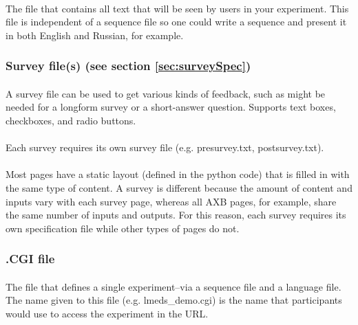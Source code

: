 \paragraph{}
The file that contains all text that will be seen by users in your experiment.  This file is independent of a sequence file so one could write a sequence and present it in both English and Russian, for example.


\subsubsection{Survey file(s) (see section \ref{sec:surveySpec})}

\paragraph{}
A survey file can be used to get various kinds of feedback, such as might be needed for a longform survey or a short-answer question.  Supports text boxes, checkboxes, and radio buttons.

\paragraph{}
Each survey requires its own survey file (e.g. presurvey.txt, postsurvey.txt).

\paragraph{}
Most pages have a static layout (defined in the python code) that is filled in with the same type of content.  A survey is different because the amount of content and inputs vary with each survey page, whereas all AXB pages, for example, share the same number of inputs and outputs.  For this reason, each survey requires its own specification file while other types of pages do not.


\subsubsection{.CGI file}

\paragraph{}
The file that defines a single experiment--via a sequence file and a language file.  The name given to this file (e.g. lmeds\_demo.cgi) is the name that participants would use to access the experiment in the URL.

